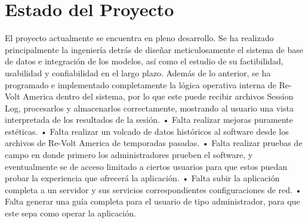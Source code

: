 \section{Estado del Proyecto}
El proyecto actualmente se encuentra en pleno desarrollo. Se ha realizado principalmente la ingeniería detrás de diseñar meticulosamente el sistema de base de datos e integración de los modelos, así como el estudio de su factibilidad, usabilidad y confiabilidad en el largo plazo.
Además de lo anterior, se ha programado e implementado completamente la lógica operativa interna de Re-Volt America dentro del sistema, por lo que este puede recibir archivos Session Log, procesarlos y almacenarlos correctamente, mostrando al usuario una vista interpretada de los resultados de la sesión.
•	Falta realizar mejoras puramente estéticas.
•	Falta realizar un volcado de datos históricos al software desde los archivos de Re-Volt America de temporadas pasadas.
•	Falta realizar pruebas de campo en donde primero los administradores prueben el software, y eventualmente se de acceso limitado a ciertos usuarios para que estos puedan probar la experiencia que ofrecerá la aplicación.
•	Falta subir la aplicación completa a un servidor y sus servicios correspondientes configuraciones de red.
•	Falta generar una guía completa para el usuario de tipo administrador, para que este sepa como operar la aplicación.


